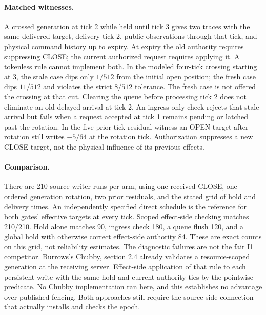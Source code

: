 \documentclass{article}
\begin{document}
\paragraph{Matched witnesses.}
A crossed generation at tick 2 while held until tick 3 gives two traces with the same delivered target, delivery tick 2, public observations through that tick, and physical command history up to expiry. At expiry the old authority requires suppressing CLOSE; the current authorized request requires applying it. A tokenless rule cannot implement both. In the modeled four-tick crossing starting at 3, the stale case dips only \(1/512\) from the initial open position; the fresh case dips \(11/512\) and violates the strict \(8/512\) tolerance. The fresh case is not offered the crossing at that cut. Clearing the queue before processing tick 2 does not eliminate an old delayed arrival at tick 2. An ingress-only check rejects that stale arrival but fails when a request accepted at tick 1 remains pending or latched past the rotation. In the five-prior-tick residual witness an OPEN target after rotation still writes \(-5/64\) at the rotation tick. Authorization suppresses a new CLOSE target, not the physical influence of its previous effects.

\paragraph{Comparison.}
There are 210 source-writer runs per arm, using one received CLOSE, one ordered generation rotation, two prior residuals, and the stated grid of hold and delivery times. An independently specified direct schedule is the reference for both gates' effective targets at every tick. Scoped effect-side checking matches 210/210. Hold alone matches 90, ingress check 180, a queue flush 120, and a global hold with otherwise correct effect-side authority 84. These are exact counts on this grid, not reliability estimates. The diagnostic failures are not the fair I1 competitor. Burrows's \href{https://static.usenix.org/events/osdi06/tech/full_papers/burrows/burrows_html/}{Chubby, section 2.4} already validates a resource-scoped generation at the receiving server. Effect-side application of that rule to each persistent write with the same hold and current authority ties by the pointwise predicate. No Chubby implementation ran here, and this establishes no advantage over published fencing. Both approaches still require the source-side connection that actually installs and checks the epoch.
\end{document}
